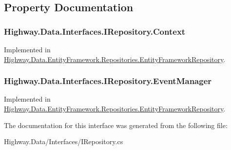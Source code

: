\subsection{Property Documentation}
\hypertarget{interface_highway_1_1_data_1_1_interfaces_1_1_i_repository_aadf2e3d1d5b118f2fe6e2b1fc1ae8e77}{
\subsubsection[{Context}]{ Highway.\-Data.\-Interfaces.\-I\-Repository.\-Context\hspace{0.3cm}{\ttfamily [get]}}}\label{interface_highway_1_1_data_1_1_interfaces_1_1_i_repository_aadf2e3d1d5b118f2fe6e2b1fc1ae8e77}






Implemented in \hyperlink{class_highway_1_1_data_1_1_entity_framework_1_1_repositories_1_1_entity_framework_repository_a39447e7deb1284fc5e5d9ea7c2c78c63}{Highway.\-Data.\-Entity\-Framework.\-Repositories.\-Entity\-Framework\-Repository}.

\hypertarget{interface_highway_1_1_data_1_1_interfaces_1_1_i_repository_a2f76cda20f7e51ce44c11a077194c747}{
\subsubsection[{Event\-Manager}]{ Highway.\-Data.\-Interfaces.\-I\-Repository.\-Event\-Manager\hspace{0.3cm}{\ttfamily [get]}}}\label{interface_highway_1_1_data_1_1_interfaces_1_1_i_repository_a2f76cda20f7e51ce44c11a077194c747}






Implemented in \hyperlink{class_highway_1_1_data_1_1_entity_framework_1_1_repositories_1_1_entity_framework_repository_abb629b7ba44c32a78951f64554f52e06}{Highway.\-Data.\-Entity\-Framework.\-Repositories.\-Entity\-Framework\-Repository}.



The documentation for this interface was generated from the following file\-:\begin{DoxyCompactItemize}
\item 
Highway.\-Data/\-Interfaces/I\-Repository.\-cs\end{DoxyCompactItemize}
